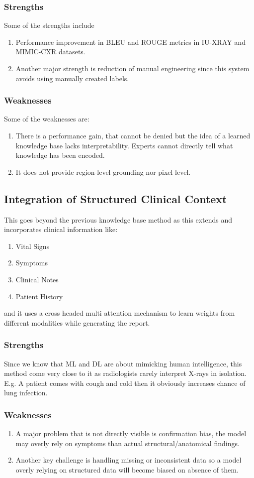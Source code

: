 \subsubsection{Strengths}
Some of the strengths include
\begin{enumerate}
    \item Performance improvement in BLEU and ROUGE metrics in IU-XRAY and MIMIC-CXR datasets.
    \item Another major strength is reduction of manual engineering since this system avoids using manually created labels.
\end{enumerate}
\subsubsection{Weaknesses}
Some of the weaknesses are:
\begin{enumerate}
    \item There is a performance gain, that cannot be denied but the idea of a learned knowledge base lacks interpretability. Experts cannot directly tell what knowledge has been encoded.
    \item It does not provide region-level grounding nor pixel level.
\end{enumerate}

\subsection{Integration of Structured Clinical Context}
This goes beyond the previous knowledge base method as this extends and incorporates clinical information like:
\begin{enumerate}
    \item Vital Signs
    \item Symptoms
    \item Clinical Notes
    \item Patient History
\end{enumerate}
and it uses a cross headed multi attention mechanism to learn weights from different modalities while generating the report.
\subsubsection{Strengths}
Since we know that ML and DL are about mimicking human intelligence, this method come very close to it as radiologists rarely interpret X-rays in isolation. E.g. A patient comes with cough and cold then it obviously increases chance of lung infection.
\subsubsection{Weaknesses}
\begin{enumerate}
    \item A major problem that is not directly visible is confirmation bias, the model may overly rely on symptoms than actual structural/anatomical findings.
    \item Another key challenge is handling missing or inconsistent data so a model overly relying on structured data will become biased on absence of them.
\end{enumerate}
